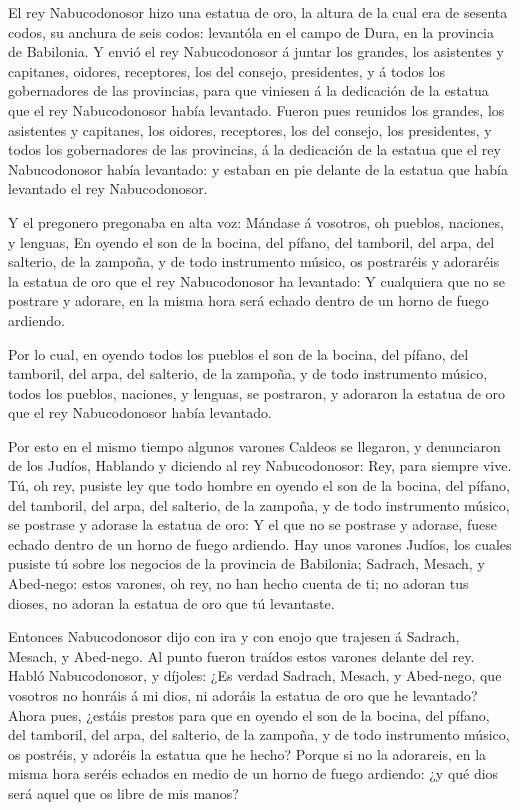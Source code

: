  El rey Nabucodonosor hizo una estatua de oro, la altura de
la cual era de sesenta codos, su anchura de seis codos: levantóla en el
campo de Dura, en la provincia de Babilonia.  Y envió el rey
Nabucodonosor á juntar los grandes, los asistentes y capitanes, oidores,
receptores, los del consejo, presidentes, y á todos los gobernadores de
las provincias, para que viniesen á la dedicación de la estatua que el
rey Nabucodonosor había levantado.  Fueron pues reunidos los
grandes, los asistentes y capitanes, los oidores, receptores, los del
consejo, los presidentes, y todos los gobernadores de las provincias, á
la dedicación de la estatua que el rey Nabucodonosor había levantado: y
estaban en pie delante de la estatua que había levantado el rey
Nabucodonosor.

 Y el pregonero pregonaba en alta voz: Mándase á vosotros,
oh pueblos, naciones, y lenguas,  En oyendo el son de la
bocina, del pífano, del tamboril, del arpa, del salterio, de la zampoña,
y de todo instrumento músico, os postraréis y adoraréis la estatua de
oro que el rey Nabucodonosor ha levantado:  Y cualquiera que
no se postrare y adorare, en la misma hora será echado dentro de un
horno de fuego ardiendo.

 Por lo cual, en oyendo todos los pueblos el son de la
bocina, del pífano, del tamboril, del arpa, del salterio, de la zampoña,
y de todo instrumento músico, todos los pueblos, naciones, y lenguas, se
postraron, y adoraron la estatua de oro que el rey Nabucodonosor había
levantado.

 Por esto en el mismo tiempo algunos varones Caldeos se
llegaron, y denunciaron de los Judíos,  Hablando y diciendo
al rey Nabucodonosor: Rey, para siempre vive.  Tú, oh rey,
pusiste ley que todo hombre en oyendo el son de la bocina, del pífano,
del tamboril, del arpa, del salterio, de la zampoña, y de todo
instrumento músico, se postrase y adorase la estatua de oro:
 Y el que no se postrase y adorase, fuese echado dentro de
un horno de fuego ardiendo.  Hay unos varones Judíos, los
cuales pusiste tú sobre los negocios de la provincia de Babilonia;
Sadrach, Mesach, y Abed-nego: estos varones, oh rey, no han hecho cuenta
de ti; no adoran tus dioses, no adoran la estatua de oro que tú
levantaste.

 Entonces Nabucodonosor dijo con ira y con enojo que
trajesen á Sadrach, Mesach, y Abed-nego. Al punto fueron traídos estos
varones delante del rey.  Habló Nabucodonosor, y díjoles:
¿Es verdad Sadrach, Mesach, y Abed-nego, que vosotros no honráis á mi
dios, ni adoráis la estatua de oro que he levantado?  Ahora
pues, ¿estáis prestos para que en oyendo el son de la bocina, del
pífano, del tamboril, del arpa, del salterio, de la zampoña, y de todo
instrumento músico, os postréis, y adoréis la estatua que he hecho?
Porque si no la adorareis, en la misma hora seréis echados en medio de
un horno de fuego ardiendo: ¿y qué dios será aquel que os libre de mis
manos?

